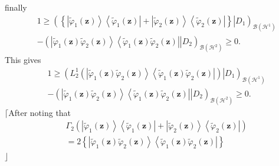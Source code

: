 \documentclass[aps,preprint]{revtex4}%
\begin{document}
finally
\begin{align}
&  1\geq\left(  \left.  \left\{  \left\vert \tilde{\varphi}_{1}\left(
\mathbf{z}\right)  \right\rangle \left\langle \tilde{\varphi}_{1}\left(
\mathbf{z}\right)  \right\vert +\left\vert \tilde{\varphi}_{2}\left(
\mathbf{z}\right)  \right\rangle \left\langle \tilde{\varphi}_{2}\left(
\mathbf{z}\right)  \right\vert \right\}  \right\vert D_{1}\right)
_{\mathcal{B}\left(  \mathcal{H}^{1}\right)  }\nonumber\\
&  \left.  -\right.  \left(  \left.  \left\vert \tilde{\varphi}_{1}\left(
\mathbf{z}\right)  \tilde{\varphi}_{2}\left(  \mathbf{z}\right)  \right\rangle
\left\langle \tilde{\varphi}_{1}\left(  \mathbf{z}\right)  \tilde{\varphi}%
_{2}\left(  \mathbf{z}\right)  \right\vert \right\vert D_{2}\right)
_{\mathcal{B}\left(  \mathcal{H}^{2}\right)  }\geq0.
\end{align}
This gives
\begin{align}
&  1\geq\left(  \left.  L_{2}^{1}\left(  \left\vert \tilde{\varphi}_{1}\left(
\mathbf{z}\right)  \tilde{\varphi}_{2}\left(  \mathbf{z}\right)  \right\rangle
\left\langle \tilde{\varphi}_{1}\left(  \mathbf{z}\right)  \tilde{\varphi}%
_{2}\left(  \mathbf{z}\right)  \right\vert \right)  \right\vert D_{1}\right)
_{\mathcal{B}\left(  \mathcal{H}^{1}\right)  }\nonumber\\
&  \left.  -\right.  \left(  \left.  \left\vert \tilde{\varphi}_{1}\left(
\mathbf{z}\right)  \tilde{\varphi}_{2}\left(  \mathbf{z}\right)  \right\rangle
\left\langle \tilde{\varphi}_{1}\left(  \mathbf{z}\right)  \tilde{\varphi}%
_{2}\left(  \mathbf{z}\right)  \right\vert \right\vert D_{2}\right)
_{\mathcal{B}\left(  \mathcal{H}^{2}\right)  }\geq0.
\end{align}
$\lceil$After noting that
\begin{align}
&  \Gamma_{2}\left(  \left\vert \tilde{\varphi}_{1}\left(  \mathbf{z}\right)
\right\rangle \left\langle \tilde{\varphi}_{1}\left(  \mathbf{z}\right)
\right\vert +\left\vert \tilde{\varphi}_{2}\left(  \mathbf{z}\right)
\right\rangle \left\langle \tilde{\varphi}_{2}\left(  \mathbf{z}\right)
\right\vert \right) \nonumber\\
&  \left.  =\right.  2\left\{  \left\vert \tilde{\varphi}_{1}\left(
\mathbf{z}\right)  \tilde{\varphi}_{2}\left(  \mathbf{z}\right)  \right\rangle
\left\langle \tilde{\varphi}_{1}\left(  \mathbf{z}\right)  \tilde{\varphi}%
_{2}\left(  \mathbf{z}\right)  \right\vert \right\}
\end{align}
$\rfloor$
\end{document}
